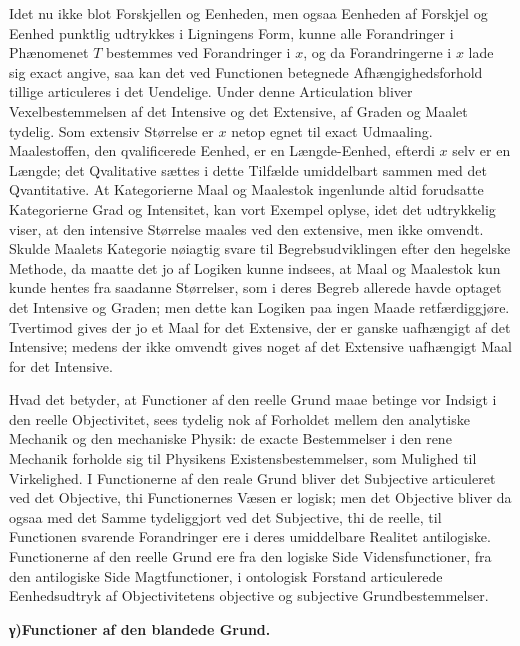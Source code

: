 \documentclass[12pt]{book}
\newcommand{\opage}[1]{\marginnote{\footnotesize\textit{[#1]}}}
\begin{document}
Idet nu ikke blot Forskjellen og Eenheden, men ogsaa Eenheden af Forskjel og Eenhed punktlig udtrykkes
i Ligningens Form, kunne alle Forandringer i Phænomenet $T$ bestemmes ved Forandringer i $x$, og da
Forandringerne i $x$ lade sig exact angive, saa kan det ved Functionen betegnede Afhængighedsforhold
tillige articuleres i det Uendelige. Under denne Articulation bliver Vexelbestemmelsen af det Intensive
og det Extensive, af Graden og Maalet tydelig. Som extensiv Størrelse er $x$ netop egnet til exact
Udmaaling. Maalestoffen, den qvalificerede Eenhed, er en Længde-Eenhed, efterdi $x$ selv er en Længde;
det Qvalitative sættes i dette Tilfælde umiddelbart sammen med det Qvantitative. At Kategorierne Maal og
Maalestok ingenlunde altid forudsatte Kategorierne Grad og Intensitet, kan vort Exempel oplyse, idet det
udtrykkelig viser, at den intensive Størrelse maales ved den extensive, men ikke omvendt. Skulde Maalets
Kategorie nøiagtig svare til Begrebsudviklingen efter den hegelske Methode, da maatte det jo af Logiken
kunne indsees, at Maal og Maalestok kun kunde hentes fra saadanne Størrelser, som i deres Begreb allerede
havde optaget det Intensive og Graden; men dette kan Logiken paa ingen Maade retfærdiggjøre. Tvertimod
gives der jo et Maal for det Extensive, der er ganske
\opage{316} uafhængigt af det Intensive; medens der ikke omvendt gives noget af det Extensive uafhængigt Maal for
det Intensive.

Hvad det betyder, at Functioner af den reelle Grund maae betinge vor Indsigt i den reelle Objectivitet,
sees tydelig nok af Forholdet mellem den analytiske Mechanik og den mechaniske Physik: de exacte
Bestemmelser i den rene Mechanik forholde sig til Physikens Existensbestemmelser, som Mulighed til
Virkelighed. I Functionerne af den reale Grund bliver det Subjective articuleret ved det Objective, thi
Functionernes Væsen er logisk; men det Objective bliver da ogsaa med det Samme tydeliggjort ved det
Subjective, thi de reelle, til Functionen svarende Forandringer ere i deres umiddelbare Realitet
antilogiske. Functionerne af den reelle Grund ere fra den logiske Side Vidensfunctioner, fra den
antilogiske Side Magtfunctioner, i ontologisk Forstand articulerede Eenhedsudtryk af Objectivitetens
objective og subjective Grundbestemmelser.

\begin{center}{\bfseries γ)\quad Functioner af den blandede Grund.}\end{center}
\end{document}
